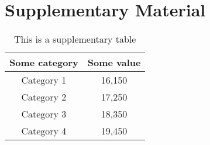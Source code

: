 \documentclass[11pt,onecolumn,letterpaper]{article}
\newcommand{\beginsupplement}{%
        \setcounter{table}{0}
        \renewcommand{\thetable}{S\arabic{table}}%
        \setcounter{figure}{0}
        \renewcommand{\thefigure}{S\arabic{figure}}%
     }
\begin{document}
\section{Supplementary Material}
\label{Sec:appendix}

\beginsupplement

\begin{table}[h]
\centering
\begin{tabular}{cc}
\toprule
Some category  & Some value \\
\midrule
Category 1 & 16,150 \\
Category 2 & 17,250 \\
Category 3 & 18,350 \\
Category 4 & 19,450 \\
\bottomrule
\end{tabular}
\caption{This is a supplementary table}
\label{table:s1}
\end{table}
\end{document}
